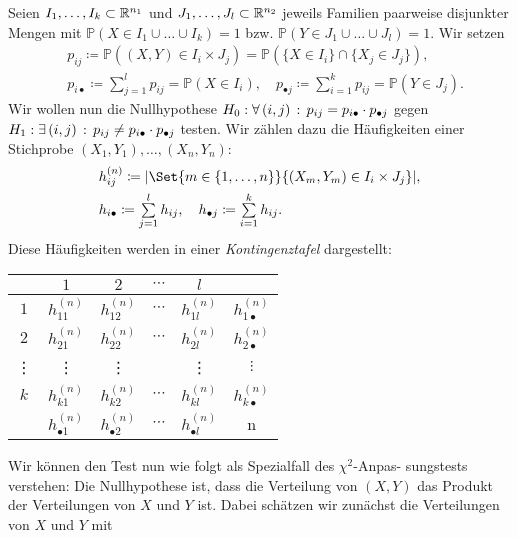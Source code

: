 \documentclass{cheat-sheet}
\renewcommand{\P}{\mathbb{P}} %
\begin{document}
\begin{verf}
  Seien $I_1, \ldots, I_k \subset \mathbb{R}^{n_1}$ und $J_1, \ldots, J_l \subset \mathbb{R}^{n_2}$ jeweils Familien paarweise disjunkter Mengen mit $\P(X \in I_1 \cup \ldots \cup I_k) = 1$ bzw. $\P(Y \in J_1 \cup \ldots \cup J_l) = 1$.
  Wir setzen
  \begin{align*}
    & p_{ij} \coloneqq \P((X, Y) \in I_i \times J_j) = \P(\{ X \in I_i \} \cap \{ X_j \in J_j \}), \\
    & p_{i\bullet} \coloneqq \sum_{j=1}^l p_{ij} = \P(X \in I_i), \quad
    p_{\bullet j} \coloneqq \sum_{i=1}^k p_{ij} = \P(Y \in J_j).
  \end{align*}
  Wir wollen nun die Nullhypothese $H_0 : \forall \, {(i, j)} \,:\, p_{ij} = p_{i \bullet} \cdot p_{\bullet j}$ gegen $H_1 : \exists \, {(i,j)} \,:\, p_{ij} \neq p_{i \bullet} \cdot p_{\bullet j}$ testen.
  Wir zählen dazu die Häufigkeiten einer Stichprobe $(X_1, Y_1), \ldots, (X_n, Y_n)$:
  \begin{align*}
    & h_{ij}^{(n)} \coloneqq \abs{\Set{m \in \{ 1, \ldots, n \}}{(X_m, Y_m) \in I_i \times J_j}}, \\
    & h_{i \bullet} \coloneqq \sum_{j=1}^l h_{ij}, \quad
    h_{\bullet j} \coloneqq \sum_{i=1}^k h_{ij}.
  \end{align*}
  Diese Häufigkeiten werden in einer \emph{Kontingenztafel} dargestellt:
  \begin{center}
    \renewcommand{\arraystretch}{1.5}
    \begin{tabular}{c | c c c c | c}
      & $1$ & $2$ & $\cdots$ & $l$ & \\ \hline
      $1$ & $h_{11}^{(n)}$ & $h_{12}^{(n)}$ & $\cdots$ & $h_{1l}^{(n)}$ & $h_{1 \bullet}^{(n)}$ \\
      $2$ & $h_{21}^{(n)}$ & $h_{22}^{(n)}$ & $\cdots$ & $h_{2l}^{(n)}$ & $h_{2 \bullet}^{(n)}$ \\
      \vdots & \vdots & \vdots & & \vdots & $\vdots$ \\
      $k$ & $h_{k1}^{(n)}$ & $h_{k2}^{(n)}$ & $\cdots$ & $h_{kl}^{(n)}$ & $h_{k \bullet}^{(n)}$ \\ \hline
      & $h_{\bullet 1}^{(n)}$ & $h_{\bullet 2}^{(n)}$ & $\cdots$ & $h_{\bullet l}^{(n)}$ & n
    \end{tabular}
  \end{center}
  Wir können den Test nun wie folgt als Spezialfall des $\chi^2$-Anpas- sungstests verstehen: Die Nullhypothese ist, dass die Verteilung von $(X, Y)$ das Produkt der Verteilungen von $X$ und $Y$ ist.
  Dabei schätzen wir zunächst die Verteilungen von $X$ und $Y$ mit

\end{verf}
\end{document}
